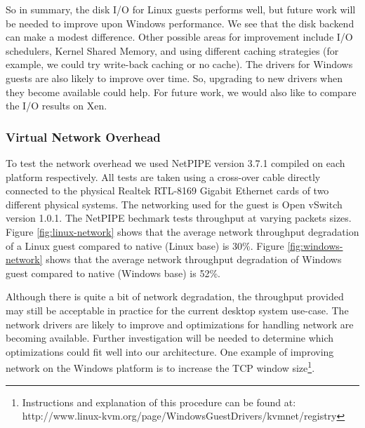 So in summary, the disk I/O for Linux guests performs well, but future work will be needed to improve upon Windows performance. We see that the disk backend can make a modest difference. Other possible areas for improvement include I/O schedulers, Kernel Shared Memory, and using different caching strategies (for example, we could try write-back caching or no cache). The drivers for Windows guests are also likely to improve over time. So, upgrading to new drivers when they become available could help. For future work, we would also like to compare the I/O results on Xen.

\pagebreak

\subsubsection{Virtual Network Overhead}

To test the network overhead we used NetPIPE version 3.7.1 compiled on each platform respectively. All tests are taken using a cross-over cable directly connected to the physical Realtek RTL-8169 Gigabit Ethernet cards of two different physical systems. The networking used for the guest is Open vSwitch version 1.0.1. The NetPIPE bechmark tests throughput at varying packets sizes. Figure \ref{fig:linux-network} shows that the average network throughput degradation of a Linux guest compared to native (Linux base) is 30\%. Figure \ref{fig:windows-network} shows that the average network throughput degradation of Windows guest compared to native (Windows base) is 52\%.

Although there is quite a bit of network degradation, the throughput provided may still be acceptable in practice for the current desktop system use-case. The network drivers are likely to improve and optimizations for handling network are becoming available. Further investigation will be needed to determine which optimizations could fit well into our architecture. One example of improving network on the Windows platform is to increase the TCP window size\footnote{Instructions and explanation of this procedure can be found at:  http://www.linux-kvm.org/page/WindowsGuestDrivers/kvmnet/registry}.

